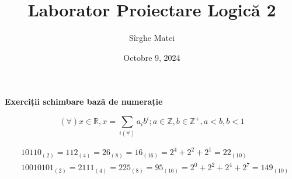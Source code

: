 \documentclass[12pt]{article}
\title{\bfseries Laborator Proiectare Logică 2}
\author{Sîrghe Matei}
\date{Octobre 9, 2024}
\begin{document}
\maketitle

\begin{center}
    \large \textbf{Exerciții schimbare bază de numerație}
\end{center}

\begin{equation}
    (\forall) x \in \mathbb{R} , x= \sum_{i(\forall)} a_{i} b^{i} ; a \in \mathbb{Z}, b \in \mathbb{Z^{+}}, a<b, b<1
\end{equation}

\begin{align*}
    & 10110_{(2)} = 112_{(4)} = 26_{(8)} = 16_{(16)} = 2^{4} + 2^{2} + 2^{1} = 22_{(10)}\\
    & 10010101_{(2)} = 2111_{(4)} = 225_{(8)} = 95_{(16)} = 2^{0}+2^{2}+2^{4}+2^{7} = 149_{(10)}
    
\end{align*}
\end{document}
